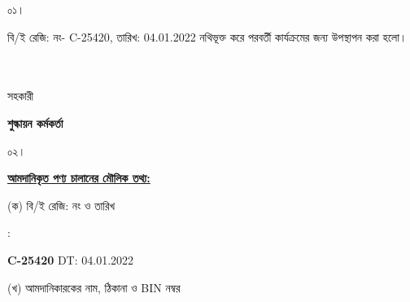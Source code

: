 \documentclass[12pt]{article}
\newcommand{\beno}{C-25420}
\newcommand{\bedt}{04.01.2022}
\begin{document}
\vspace*{4mm}
\noindent
\begin{minipage}[t]{0.05\linewidth}
০১।
\end{minipage}
\begin{minipage}[t]{0.95\linewidth}
বি/ই রেজি: নং- {\beno}, তারিখ: {\bedt}
নথিভূক্ত করে
পরবর্তী কার্যক্রমের জন্য উপস্থাপন করা হলো।
\\
\\
\\
\end{minipage}
\begin{minipage}[t]{0.05\linewidth}
\hspace*{0em}
\end{minipage}
\begin{minipage}[t]{0.05\linewidth}
সহকারী
\end{minipage}
\begin{minipage}[t]{0.37\linewidth}
\hspace{0em}
\end{minipage}
\begin{minipage}[t]{0.53\linewidth}
\textbf{শুল্কায়ন কর্মকর্তা}
\\
\end{minipage}
\begin{minipage}[t]{0.05\linewidth}
০২।
\end{minipage}
\begin{minipage}[t]{0.95\linewidth}
\underline{\textbf {আমদানিকৃত পণ্য চালানের
মৌলিক তথ্য:}}
\\
\end{minipage}
\footnotesize
\begin{minipage}[t]{0.05\linewidth}
\hspace*{1em}
\end{minipage}
\begin{minipage}[t]{0.40\linewidth}
(ক) বি/ই রেজি: নং ও তারিখ
\end{minipage}
\begin{minipage}[t]{0.02\linewidth}
:
\end{minipage}
\begin{minipage}[t]{0.53\linewidth}
\textbf{{\beno}} \hspace{2em} DT: {\bedt}
\\
\end{minipage}
\begin{minipage}[t]{0.05\linewidth}
\hspace*{1em}
\end{minipage}
\begin{minipage}[t]{0.40\linewidth}
(খ) আমদানিকারকের নাম, ঠিকানা
ও BIN নম্বর
\end{minipage}
\end{document}

